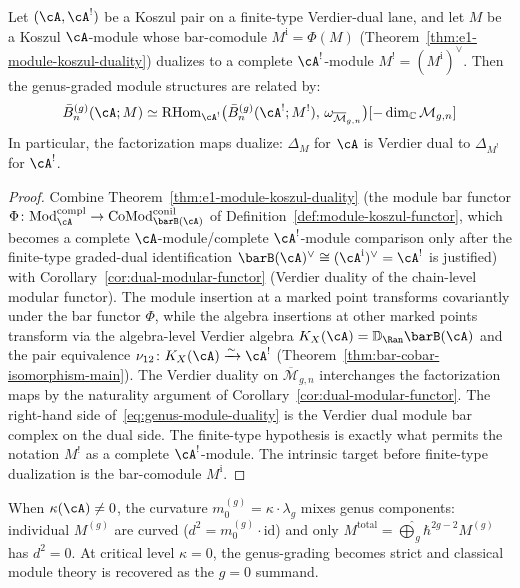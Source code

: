\begin{proposition}\label{prop:genus-module-koszul}
Let $(\cA,\cA^!)$ be a Koszul pair on a finite-type Verdier-dual
lane, and let $M$ be a Koszul $\cA$-module whose bar-comodule
$M^{\mathrm{i}}=\Phi(M)$
\textup{(}Theorem~\textup{\ref{thm:e1-module-koszul-duality}}\textup{)}
dualizes to a complete $\cA^!$-module
$M^!=(M^{\mathrm{i}})^\vee$. Then
the genus-graded module structures are related by:
\begin{equation}\label{eq:genus-module-duality}
\bar{B}^{(g)}_n(\cA; M) \simeq
\mathrm{RHom}_{\cA^!}\bigl(\bar{B}^{(g)}_n(\cA^!; M^!),\,
\omega_{\overline{\mathcal{M}}_{g,n}}\bigr)
[-\dim_{\mathbb{C}} \mathcal{M}_{g,n}]
\end{equation}
In particular, the factorization maps dualize:
$\Delta_M$ for $\cA$ is Verdier dual to $\Delta_{M^!}$ for $\cA^!$.
\end{proposition}

\begin{proof}
Combine Theorem~\ref{thm:e1-module-koszul-duality} (the module bar
functor
$\Phi\colon \mathrm{Mod}^{\mathrm{compl}}_{\cA}
\to \mathrm{CoMod}^{\mathrm{conil}}_{\barB(\cA)}$ of
Definition~\ref{def:module-koszul-functor}, which becomes a complete
$\cA$-module/complete $\cA^!$-module comparison only after the
finite-type graded-dual identification
$\barB(\cA)^\vee \cong
(\cA^{\mathrm{i}})^\vee=\cA^!$ is justified)
with Corollary~\ref{cor:dual-modular-functor} (Verdier duality of
the chain-level modular functor). The module insertion at a marked
point transforms covariantly under the bar functor $\Phi$,
while the algebra insertions at other marked points transform via
the algebra-level Verdier algebra
$K_X(\cA)=\mathbb{D}_{\Ran}\barB(\cA)$ and the pair equivalence
$\nu_{12}\colon K_X(\cA)\xrightarrow{\sim}\cA^!$
(Theorem~\ref{thm:bar-cobar-isomorphism-main}). The Verdier duality on
$\overline{\mathcal{M}}_{g,n}$ interchanges the factorization
maps by the naturality argument of
Corollary~\ref{cor:dual-modular-functor}. The right-hand side
of~\eqref{eq:genus-module-duality} is the Verdier dual module bar
complex on the dual side. The finite-type hypothesis is exactly what
permits the notation $M^!$ as a complete $\cA^!$-module.  The
intrinsic target before finite-type dualization is the bar-comodule
$M^{\mathrm{i}}$.
\end{proof}

\begin{remark}
\label{rem:curvature-genus-obstruction}
When $\kappa(\cA) \neq 0$, the curvature
$m_0^{(g)} = \kappa \cdot \lambda_g$ mixes genus components:
individual $M^{(g)}$ are curved
($d^2 = m_0^{(g)} \cdot \mathrm{id}$) and only
$M^{\mathrm{total}} =
\widehat{\bigoplus}_g \hbar^{2g-2} M^{(g)}$ has $d^2 = 0$.
At critical level $\kappa = 0$, the genus-grading becomes strict and
classical module theory is recovered as the $g = 0$ summand.
\end{remark}

